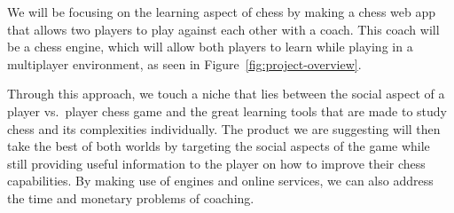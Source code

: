 We will be focusing on the learning aspect of chess by making a chess web app that allows two players to play against
each other with a coach.
This coach will be a chess engine, which will allow both players to learn while playing in a multiplayer environment, as
seen in Figure~\ref{fig:project-overview}.

Through this approach, we touch a niche that lies between the social aspect of a player vs.\ player chess game and the
great learning tools that are made to study chess and its complexities individually.
The product we are suggesting will then take the best of both worlds by targeting the social aspects of the game while
still providing useful information to the player on how to improve their chess capabilities.
By making use of engines and online services, we can also address the time and monetary problems of coaching.
